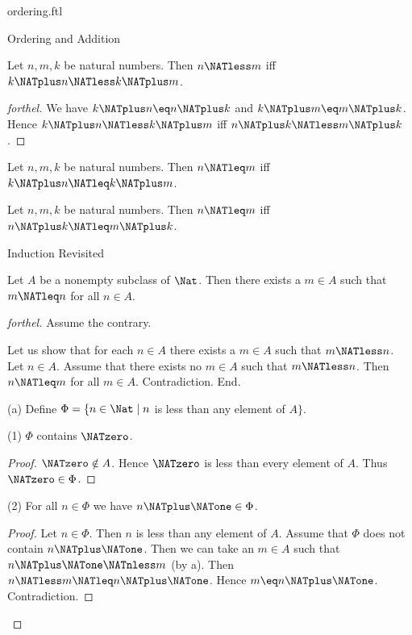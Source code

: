 \documentclass{naproche-library}
\begin{document}
\begin{smodule}[title=The Standard Ordering of the Natural Numbers]{ordering.ftl}
\begin{sfragment}{Ordering and Addition}
  \begin{corollary}[forthel,id=ARITHMETIC_04_1901366129721344]
    Let $n, m, k$ be natural numbers.
    Then $n \NATless m$ iff $k \NATplus n \NATless k \NATplus m$.
  \end{corollary}
  \begin{proof}[forthel]
    We have $k \NATplus n \eq n \NATplus k$ and $k \NATplus m \eq m \NATplus k$.
    Hence $k \NATplus n \NATless k \NATplus m$ iff $n \NATplus k \NATless m \NATplus k$.
  \end{proof}

  \begin{corollary}[forthel,id=ARITHMETIC_04_4203390999461888]
    Let $n, m, k$ be natural numbers.
    Then $n \NATleq m$ iff $k \NATplus n \NATleq k \NATplus m$.
  \end{corollary}

  \begin{corollary}[forthel,id=ARITHMETIC_04_5512590832697344]
    Let $n, m, k$ be natural numbers.
    Then $n \NATleq m$ iff $n \NATplus k \NATleq m \NATplus k$.
  \end{corollary}
\end{sfragment}

\begin{sfragment}{Induction Revisited}
  \begin{proposition}[forthel,id=ARITHMETIC_04_272317502455808]
    Let $A$ be a nonempty subclass of $\Nat$.
    Then there exists a $m \in A$ such that $m \NATleq n$ for all $n \in A$.
  \end{proposition}
  \begin{proof}[forthel]
    Assume the contrary.

    Let us show that for each $n \in A$ there exists a $m \in A$ such that $m \NATless n$.
      Let $n \in A$.
      Assume that there exists no $m \in A$ such that $m \NATless n$.
      Then $n \NATleq m$ for all $m \in A$.
      Contradiction.
    End.

    (a) Define $\Phi = \{ n \in \Nat \mid n$ is less than any element of $A \}$.

    (1) $\Phi$ contains $\NATzero$.
    \begin{proof}
      $\NATzero \notin A$.
      Hence $\NATzero$ is less than every element of $A$.
      Thus $\NATzero \in \Phi$.
    \end{proof}

    (2) For all $n \in \Phi$ we have $n \NATplus \NATone \in \Phi$.
    \begin{proof}
      Let $n \in \Phi$.
      Then $n$ is less than any element of $A$.
      Assume that $\Phi$ does not contain $n \NATplus \NATone$.
      Then we can take an $m \in A$ such that $n \NATplus \NATone \NATnless m$ (by a).
      Then $n \NATless m \NATleq n \NATplus \NATone$.
      Hence $m \eq n \NATplus \NATone$.
      Contradiction.
    \end{proof}


\end{proof}
\end{sfragment}
\end{smodule}
\end{document}
